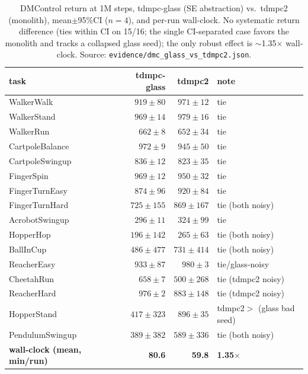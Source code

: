 \begin{table}[t]
\centering\small
\caption{DMControl return at 1M steps, tdmpc-glass (SE abstraction) vs.\ tdmpc2 (monolith),
mean$\pm$95\%CI ($n{=}4$), and per-run wall-clock. No systematic return difference (ties within CI
on 15/16; the single CI-separated case favors the monolith and tracks a collapsed glass seed); the only
robust effect is $\sim$1.35$\times$ wall-clock. Source: \texttt{evidence/dmc\_glass\_vs\_tdmpc2.json}.}
\label{tab:bench}
\begin{tabular}{lrrl}
\toprule
task & tdmpc-glass & tdmpc2 & note \\
\midrule
WalkerWalk      & $919{\pm}80$  & $971{\pm}12$  & tie \\
WalkerStand     & $969{\pm}14$  & $979{\pm}16$  & tie \\
WalkerRun       & $662{\pm}8$   & $652{\pm}34$  & tie \\
CartpoleBalance & $972{\pm}9$   & $945{\pm}50$  & tie \\
CartpoleSwingup & $836{\pm}12$  & $823{\pm}35$  & tie \\
FingerSpin      & $969{\pm}12$  & $950{\pm}32$  & tie \\
FingerTurnEasy  & $874{\pm}96$  & $920{\pm}84$  & tie \\
FingerTurnHard  & $725{\pm}155$ & $869{\pm}167$ & tie (both noisy) \\
AcrobotSwingup  & $296{\pm}11$  & $324{\pm}99$  & tie \\
HopperHop       & $196{\pm}142$ & $265{\pm}63$  & tie (both noisy) \\
BallInCup       & $486{\pm}477$ & $731{\pm}414$ & tie (both noisy) \\
ReacherEasy     & $933{\pm}87$  & $980{\pm}3$   & tie/glass-noisy \\
CheetahRun      & $658{\pm}7$   & $500{\pm}268$ & tie (tdmpc2 noisy) \\
ReacherHard     & $976{\pm}2$   & $883{\pm}148$ & tie (tdmpc2 noisy) \\
HopperStand     & $417{\pm}323$ & $896{\pm}35$  & tdmpc2$>$ (glass bad seed) \\
PendulumSwingup & $389{\pm}382$ & $589{\pm}336$ & tie (both noisy) \\
\midrule
\textbf{wall-clock (mean, min/run)} & \textbf{80.6} & \textbf{59.8} & \textbf{1.35$\times$} \\
\bottomrule
\end{tabular}
\end{table}

